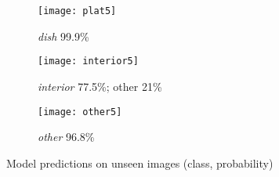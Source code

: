 \documentclass[11pt, oneside]{article}   	%
\begin{document}
\begin{figure}
\begin{subfigure}{.3\textwidth}
	\centering
	\texttt{[image: plat5]}
	\caption{\textit{dish} 99.9\%}
	\label{A subfigure label}
\end{subfigure}%
\begin{subfigure}{.3\textwidth}
	\centering
	\texttt{[image: interior5]}
	\caption{\textit{interior} 77.5\%; other 21\%}
	\label{A subfigure label}
\end{subfigure}%
\begin{subfigure}{.3\textwidth}
	\centering
	\texttt{[image: other5]}
	\caption{\textit{other} 96.8\%}
	\label{A subfigure label}
\end{subfigure}

\caption{Model predictions on unseen images (class, probability)}
\label{figure label}
\end{figure}
\end{document}
